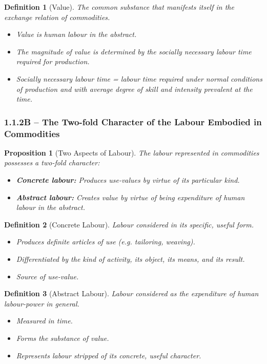 \documentclass{article}
\newtheorem{definition}{Definition}[subsubsection]
\newtheorem{proposition}{Proposition}[subsubsection]
\newcommand{\customsubsubsection}[2]{%
  \subsubsection*{#1 -- #2}%
}
\begin{document}
\begin{definition}[Value]\label{def:1.1.1.3}
The common substance that manifests itself in the exchange relation of commodities.
\begin{itemize}[noitemsep]
  \item Value is human labour in the abstract.
  \item The magnitude of value is determined by the socially necessary labour time required for production.
  \item Socially necessary labour time = labour time required under normal conditions of production and with average degree of skill and intensity prevalent at the time.
\end{itemize}
\end{definition}

\customsubsubsection{1.1.2B}{The Two-fold Character of the Labour Embodied in Commodities}

\begin{proposition}[Two Aspects of Labour]\label{prop:1.1.2.1}
The labour represented in commodities possesses a two-fold character:
\begin{itemize}[noitemsep]
  \item \textbf{Concrete labour:} Produces use-values by virtue of its particular kind.
  \item \textbf{Abstract labour:} Creates value by virtue of being expenditure of human labour in the abstract.
\end{itemize}
\end{proposition}

\begin{definition}[Concrete Labour]\label{def:1.1.2.1}
Labour considered in its specific, useful form.
\begin{itemize}[noitemsep]
  \item Produces definite articles of use (e.g. tailoring, weaving).
  \item Differentiated by the kind of activity, its object, its means, and its result.
  \item Source of use-value.
\end{itemize}
\end{definition}

\begin{definition}[Abstract Labour]\label{def:1.1.2.2}
Labour considered as the expenditure of human labour-power in general.
\begin{itemize}[noitemsep]
  \item Measured in time.
  \item Forms the substance of value.
  \item Represents labour stripped of its concrete, useful character.
\end{itemize}
\end{definition}
\end{document}
